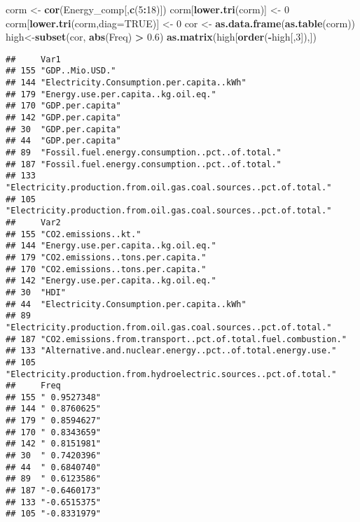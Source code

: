 \documentclass[]{article}
\newenvironment{Shaded}{\begin{snugshade}}{\end{snugshade}}
\newcommand{\KeywordTok}[1]{\textcolor[rgb]{0.13,0.29,0.53}{\textbf{#1}}}
\newcommand{\DataTypeTok}[1]{\textcolor[rgb]{0.13,0.29,0.53}{#1}}
\newcommand{\DecValTok}[1]{\textcolor[rgb]{0.00,0.00,0.81}{#1}}
\newcommand{\FloatTok}[1]{\textcolor[rgb]{0.00,0.00,0.81}{#1}}
\newcommand{\StringTok}[1]{\textcolor[rgb]{0.31,0.60,0.02}{#1}}
\newcommand{\OtherTok}[1]{\textcolor[rgb]{0.56,0.35,0.01}{#1}}
\newcommand{\OperatorTok}[1]{\textcolor[rgb]{0.81,0.36,0.00}{\textbf{#1}}}
\newcommand{\NormalTok}[1]{#1}
\begin{document}
\begin{Shaded}
\begin{Highlighting}[]
\NormalTok{corm <-}\StringTok{ }\KeywordTok{cor}\NormalTok{(Energy_comp[,}\KeywordTok{c}\NormalTok{(}\DecValTok{5}\OperatorTok{:}\DecValTok{18}\NormalTok{)])}
\NormalTok{corm[}\KeywordTok{lower.tri}\NormalTok{(corm)] <-}\StringTok{ }\DecValTok{0}
\NormalTok{corm[}\KeywordTok{lower.tri}\NormalTok{(corm,}\DataTypeTok{diag=}\OtherTok{TRUE}\NormalTok{)] <-}\StringTok{ }\DecValTok{0}
\NormalTok{cor <-}\StringTok{ }\KeywordTok{as.data.frame}\NormalTok{(}\KeywordTok{as.table}\NormalTok{(corm))}
\NormalTok{high<-}\KeywordTok{subset}\NormalTok{(cor, }\KeywordTok{abs}\NormalTok{(Freq) }\OperatorTok{>}\StringTok{ }\FloatTok{0.6}\NormalTok{)}
\KeywordTok{as.matrix}\NormalTok{(high[}\KeywordTok{order}\NormalTok{(}\OperatorTok{-}\NormalTok{high[,}\DecValTok{3}\NormalTok{]),])}
\end{Highlighting}
\end{Shaded}

\begin{verbatim}
##     Var1                                                             
## 155 "GDP..Mio.USD."                                                  
## 144 "Electricity.Consumption.per.capita..kWh"                        
## 179 "Energy.use.per.capita..kg.oil.eq."                              
## 170 "GDP.per.capita"                                                 
## 142 "GDP.per.capita"                                                 
## 30  "GDP.per.capita"                                                 
## 44  "GDP.per.capita"                                                 
## 89  "Fossil.fuel.energy.consumption..pct..of.total."                 
## 187 "Fossil.fuel.energy.consumption..pct..of.total."                 
## 133 "Electricity.production.from.oil.gas.coal.sources..pct.of.total."
## 105 "Electricity.production.from.oil.gas.coal.sources..pct.of.total."
##     Var2                                                              
## 155 "CO2.emissions..kt."                                              
## 144 "Energy.use.per.capita..kg.oil.eq."                               
## 179 "CO2.emissions..tons.per.capita."                                 
## 170 "CO2.emissions..tons.per.capita."                                 
## 142 "Energy.use.per.capita..kg.oil.eq."                               
## 30  "HDI"                                                             
## 44  "Electricity.Consumption.per.capita..kWh"                         
## 89  "Electricity.production.from.oil.gas.coal.sources..pct.of.total." 
## 187 "CO2.emissions.from.transport..pct.of.total.fuel.combustion."     
## 133 "Alternative.and.nuclear.energy..pct..of.total.energy.use."       
## 105 "Electricity.production.from.hydroelectric.sources..pct.of.total."
##     Freq        
## 155 " 0.9527348"
## 144 " 0.8760625"
## 179 " 0.8594627"
## 170 " 0.8343659"
## 142 " 0.8151981"
## 30  " 0.7420396"
## 44  " 0.6840740"
## 89  " 0.6123586"
## 187 "-0.6460173"
## 133 "-0.6515375"
## 105 "-0.8331979"
\end{verbatim}
\end{document}
